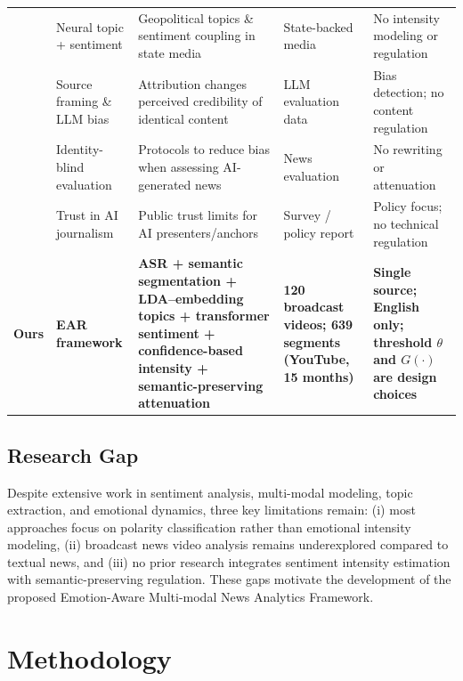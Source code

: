 \documentclass[final,1p,times]{elsarticle}
\begin{document}
\begin{table}[H]
\begin{tabular}{c p{2.1cm} p{3.4cm} p{2.4cm} p{3.2cm}}
\cite{schweizer2025political} & Neural topic + sentiment & Geopolitical topics \& sentiment coupling in state media & State-backed media & No intensity modeling or regulation \\
\cite{germani2025source} & Source framing \& LLM bias & Attribution changes perceived credibility of identical content & LLM evaluation data & Bias detection; no content regulation \\
\cite{startari2025ethos} & Identity-blind evaluation & Protocols to reduce bias when assessing AI-generated news & News evaluation & No rewriting or attenuation \\
\cite{newman2025digital} & Trust in AI journalism & Public trust limits for AI presenters/anchors & Survey / policy report & Policy focus; no technical regulation \\
\midrule
\textbf{Ours} & \textbf{EAR framework} & \textbf{ASR + semantic segmentation + LDA–embedding topics + transformer sentiment + confidence-based intensity + semantic-preserving attenuation} & \textbf{120 broadcast videos; 639 segments (YouTube, 15 months)} & \textbf{Single source; English only; threshold $\theta$ and $G(\cdot)$ are design choices} \\
\bottomrule
\end{tabular}
\end{table}

\subsection{Research Gap}

Despite extensive work in sentiment analysis, multi-modal modeling, topic extraction, and emotional dynamics, three key limitations remain: (i) most approaches focus on polarity classification rather than emotional intensity modeling, (ii) broadcast news video analysis remains underexplored compared to textual news, and (iii) no prior research integrates sentiment intensity estimation with semantic-preserving regulation. These gaps motivate the development of the proposed Emotion-Aware Multi-modal News Analytics Framework.

\section{Methodology}
\label{sec:methodology}
\end{document}
